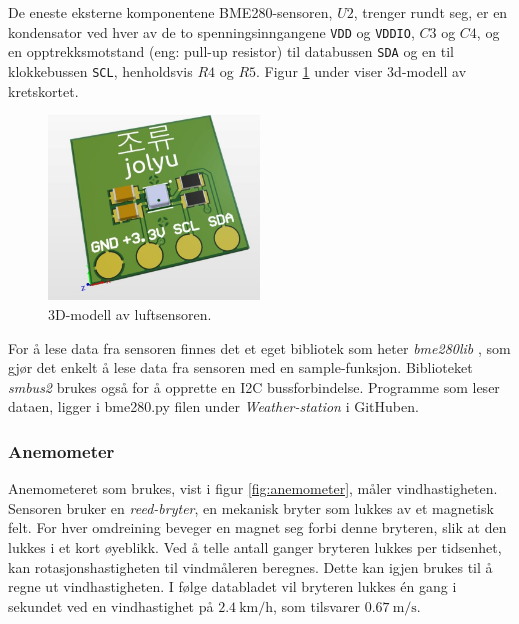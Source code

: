 De eneste eksterne komponentene BME280-sensoren, $U2$, trenger rundt seg, er en kondensator ved hver av de to spenningsinngangene \texttt{VDD} og \texttt{VDDIO}, $C3$ og $C4$, og en opptrekksmotstand (eng: pull-up resistor) til databussen \texttt{SDA} og en til klokkebussen \texttt{SCL}, henholdsvis $R4$ og $R5$. Figur \ref{fig:luftsensor_3d} under viser 3d-modell av kretskortet.

\begin{figure}[H]
    \centering
    \includegraphics[width=0.5\textwidth]{implementering/luftsensor_3d.png}
    \caption{3D-modell av luftsensoren.}
    \label{fig:luftsensor_3d}
\end{figure}

For å lese data fra sensoren finnes det et eget bibliotek som heter \textit{bme280lib} \cite{bme280lib}, som gjør det enkelt å lese data fra sensoren med en sample-funksjon. 
Biblioteket \textit{smbus2} \cite{smbus2} brukes også for å opprette en I2C bussforbindelse. Programme som leser dataen, ligger i bme280.py filen under \textit{Weather-station} i GitHuben\cite{GitHub}.

\subsubsection{Anemometer}\label{sec:impl:vaer:anemometer}

Anemometeret som brukes, vist i figur \ref{fig:anemometer}, måler vindhastigheten. 
Sensoren bruker en \textit{reed-bryter}, en mekanisk bryter som lukkes av et magnetisk felt. 
For hver omdreining beveger en magnet seg forbi denne bryteren, slik at den lukkes i et kort øyeblikk. 
Ved å telle antall ganger bryteren lukkes per tidsenhet, kan rotasjonshastigheten til vindmåleren beregnes. 
Dette kan igjen brukes til å regne ut vindhastigheten. 
I følge databladet\cite{weather} vil bryteren lukkes én gang i sekundet ved en vindhastighet på $\SI{2.4}{\kilo\meter\per\hour}$, som tilsvarer $\SI{0.67}{\meter\per\second}$.


